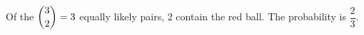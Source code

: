 Of the $\dbinom32=3$ equally likely pairs, $2$ contain the red ball. The probability is $\boxed{\dfrac{2}{3}}$.
